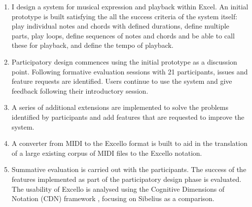 \begin{enumerate}
\item I design a system for musical expression and playback within Excel. An initial prototype is built satisfying the all the success criteria of the system itself: play individual notes and chords with defined durations, define multiple parts, play loops, define sequences of notes and chords and be able to call these for playback, and define the tempo of playback.

\item Participatory design commences using the initial prototype as a discussion point. Following formative evaluation sessions with 21 participants, issues and feature requests are identified. Users continue to use the system and give feedback following their introductory session.

\item A series of additional extensions are implemented to solve the problems identified by participants and add features that are requested to improve the system.

\item A converter from MIDI to the Excello format is built to aid in the translation of a large existing corpus of MIDI files to the Excello notation.

\item Summative evaluation is carried out with the participants. The success of the features implemented as part of the participatory design phase is evaluated. The usability of Excello is analysed using the Cognitive Dimensions of Notation (CDN) framework \cite{blackwell:tutorial}, focusing on Sibelius as a comparison.

\end{enumerate}
